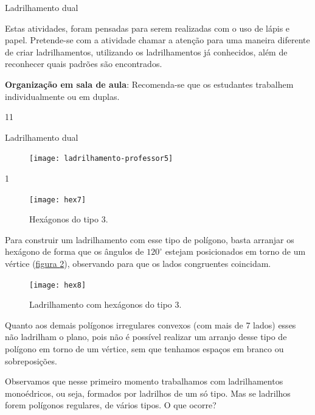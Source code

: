 \begin{sugestions}{Ladrilhamento dual}
{
	Estas atividades, foram pensadas para serem realizadas com o uso de lápis e papel. Pretende-se com a atividade chamar a atenção para uma maneira diferente de criar  ladrilhamentos, utilizando os ladrilhamentos já conhecidos, além de  reconhecer quais padrões são encontrados. 

	\textbf{Organização em sala de aula}: Recomenda-se que os estudantes trabalhem individualmente ou em duplas.
}{1}{1}
\end{sugestions}
\begin{answer}{Ladrilhamento dual}
{
	\begin{figure}[H]
	\centering
	
	\texttt{[image: ladrilhamento-professor5]}
	\end{figure}
}{1}
\end{answer}

\begin{figure}[H]
\centering
\texttt{[image: hex7]}
\caption{Hexágonos do tipo 3.}
\label{hex7}
\end{figure}

Para construir um ladrilhamento com esse tipo de polígono, basta arranjar os hexágono de forma que os ângulos de $120^{\circ}$ estejam posicionados em torno de um vértice (\hyperref[hex8]{figura \ref{hex8}}), observando para que os lados congruentes coincidam.

\begin{figure}[H]
\centering
\texttt{[image: hex8]}
\caption{Ladrilhamento com hexágonos do tipo 3.}
\label{hex8}
\end{figure}


Quanto aos demais polígonos irregulares convexos (com mais de 7 lados) esses não ladrilham o plano, pois não é possível realizar um arranjo desse tipo de polígono em torno de um vértice, sem que tenhamos espaços em branco ou sobreposições.

Observamos que nesse primeiro momento trabalhamos com ladrilhamentos monoédricos, ou seja, formados por ladrilhos de um só tipo. Mas se  ladrilhos forem polígonos regulares, de vários tipos. O que ocorre?





